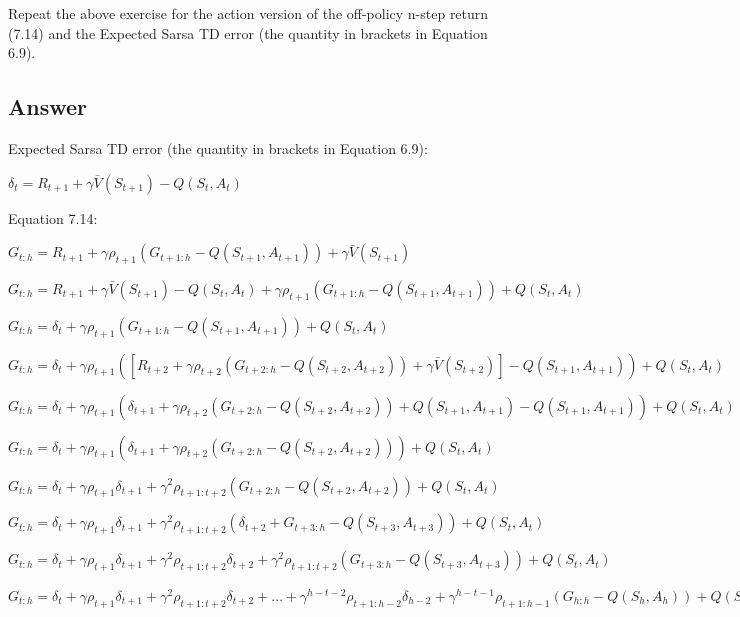 \documentclass[11pt]{article}
\begin{document}
    Repeat the above exercise for the action version of the off-policy n-step return (7.14) and the Expected Sarsa TD error (the quantity in brackets in Equation 6.9).

    \subsection*{Answer}

    Expected Sarsa TD error (the quantity in brackets in Equation 6.9):

    \noindent $ \delta_{t} = R_{t+1} + \gamma \bar{V}(S_{t+1}) -Q(S_t,A_t) $

    \noindent Equation 7.14:

    \noindent $ G_{t:h} = R_{t+1} + \gamma \rho_{t+1} (G_{t+1:h} - Q(S_{t+1},A_{t+1} )) + \gamma \bar{V}(S_{t+1}) $

    \noindent $ G_{t:h} = R_{t+1} + \gamma \bar{V}(S_{t+1}) -Q(S_t,A_t) + \gamma \rho_{t+1} (G_{t+1:h} - Q(S_{t+1},A_{t+1} ))  + Q(S_t,A_t)  $

    \noindent $ G_{t:h} = \delta_{t} + \gamma \rho_{t+1} (G_{t+1:h} - Q(S_{t+1},A_{t+1} ))  + Q(S_t,A_t) $

    \noindent $ G_{t:h} = \delta_{t} + \gamma \rho_{t+1} ( [ R_{t+2} + \gamma \rho_{t+2} (G_{t+2:h} - Q(S_{t+2},A_{t+2} )) + \gamma \bar{V}(S_{t+2}) ] - Q(S_{t+1},A_{t+1} )) + Q(S_t,A_t)$

    \noindent $ G_{t:h} = \delta_{t} + \gamma \rho_{t+1} (  \delta_{t+1} + \gamma \rho_{t+2} (G_{t+2:h} - Q(S_{t+2},A_{t+2} )) + Q(S_{t+1},A_{t+1}) - Q(S_{t+1},A_{t+1}) ) + Q(S_t,A_t) $

    \noindent $ G_{t:h} = \delta_{t} + \gamma \rho_{t+1} (  \delta_{t+1} + \gamma \rho_{t+2} (G_{t+2:h} - Q(S_{t+2},A_{t+2} ))  ) + Q(S_t,A_t) $

    \noindent $ G_{t:h} = \delta_{t} + \gamma \rho_{t+1} \delta_{t+1} + \gamma^2 \rho_{t+1:t+2} ( G_{t+2:h} - Q(S_{t+2},A_{t+2} ))  + Q(S_t,A_t) $

    \noindent $ G_{t:h} = \delta_{t} + \gamma \rho_{t+1} \delta_{t+1} + \gamma^2 \rho_{t+1:t+2} ( \delta_{t+2} +  G_{t+3:h} - Q(S_{t+3},A_{t+3} )  )  + Q(S_t,A_t) $

    \noindent $ G_{t:h} = \delta_{t} + \gamma \rho_{t+1} \delta_{t+1} + \gamma^2 \rho_{t+1:t+2} \delta_{t+2} +  \gamma^2 \rho_{t+1:t+2} (G_{t+3:h} - Q(S_{t+3},A_{t+3} )  )   + Q(S_t,A_t) $

    \noindent $ G_{t:h} = \delta_{t} + \gamma \rho_{t+1} \delta_{t+1} + \gamma^2 \rho_{t+1:t+2} \delta_{t+2} + \dots + \gamma^{h-t-2} \rho_{t+1:h-2} \delta_{h-2} + \gamma^{h-t-1} \rho_{t+1:h-1} (G_{h:h} - Q(S_{h},A_{h} )  )  + Q(S_t,A_t) $
\end{document}
